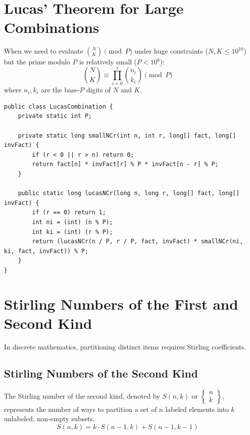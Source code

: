 \documentclass[10pt,journal,compsoc,onecolumn]{IEEEtran}
\begin{document}
\section{Lucas' Theorem for Large Combinations}
\label{sec:lucas}

When we need to evaluate $\binom{N}{K} \pmod P$ under huge constraints ($N, K \le 10^{18}$) but the prime modulo $P$ is relatively small ($P < 10^6$):
\begin{equation}
\binom{N}{K} \equiv \prod_{i=0}^{s} \binom{n_i}{k_i} \pmod P
\end{equation}
where $n_i, k_i$ are the base-$P$ digits of $N$ and $K$.

\begin{verbatim}
public class LucasCombination {
    private static int P;

    private static long smallNCr(int n, int r, long[] fact, long[] invFact) {
        if (r < 0 || r > n) return 0;
        return fact[n] * invFact[r] % P * invFact[n - r] % P;
    }

    public static long lucasNCr(long n, long r, long[] fact, long[] invFact) {
        if (r == 0) return 1;
        int ni = (int) (n % P);
        int ki = (int) (r % P);
        return (lucasNCr(n / P, r / P, fact, invFact) * smallNCr(ni, ki, fact, invFact)) % P;
    }
}
\end{verbatim}

\section{Stirling Numbers of the First and Second Kind}
\label{sec:stirling}

In discrete mathematics, partitioning distinct items requires Stirling coefficients.

\subsection{Stirling Numbers of the Second Kind}

The Stirling number of the second kind, denoted by $S(n, k)$ or $\left\{ \begin{matrix} n \\ k \end{matrix} \right\}$, represents the number of ways to partition a set of $n$ labeled elements into $k$ unlabeled, non-empty subsets.
\begin{equation}
S(n, k) = k \cdot S(n - 1, k) + S(n - 1, k - 1)
\end{equation}
\end{document}
